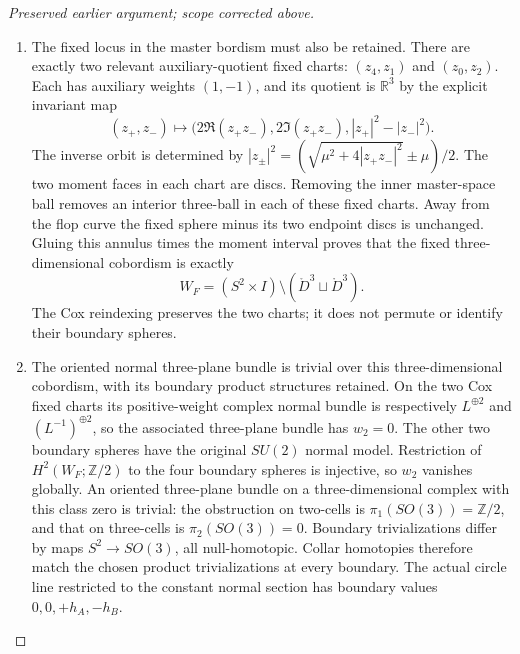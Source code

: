 \begin{proof}[Preserved earlier argument; scope corrected above]
\begin{enumerate}[label=\arabic*.]
\par\medskip\noindent\textbf{The additional normal-sphere boundary in the surgery bordism.}\enspace

\item The fixed locus in the master bordism must also be retained.
There are exactly two relevant auxiliary-quotient fixed charts:
\((z_4,z_1)\) and \((z_0,z_2)\).  Each has auxiliary
weights \((1,-1)\), and its quotient is \(\mathbb R^3\)
by the explicit invariant map
\[
      (z_+,z_-)\longmapsto
       \bigl(2\Re(z_+z_-),2\Im(z_+z_-),
                         |z_+|^2-|z_-|^2\bigr).
\]
The inverse orbit is determined by
\(|z_\pm|^2=(\sqrt{\mu^2+4|z_+z_-|^2}\pm\mu)/2\).
The two moment faces in each chart are discs.  Removing the
inner master-space ball removes an interior three-ball in
each of these fixed charts.  Away from the flop curve the
fixed sphere minus its two endpoint discs is unchanged.
Gluing this annulus times the moment interval proves that
the fixed three-dimensional cobordism is exactly
\[
                 W_F=(S^2\times I)\setminus
                             (\mathring D^3\sqcup\mathring D^3).
\]
The Cox reindexing preserves the two charts; it does not
permute or identify their boundary spheres.

\item The oriented normal three-plane bundle is trivial over this
three-dimensional cobordism, with its boundary product
structures retained.  On the two Cox fixed charts its
positive-weight complex normal bundle is respectively
\(L^{\oplus2}\) and \((L^{-1})^{\oplus2}\), so the
associated three-plane bundle has \(w_2=0\).  The other
two boundary spheres have the original \(SU(2)\) normal
model.  Restriction of \(H^2(W_F;\mathbb Z/2)\) to
the four boundary spheres is injective, so \(w_2\) vanishes
globally.  An oriented three-plane bundle on a three-dimensional
complex with this class zero is trivial: the obstruction on
two-cells is \(\pi_1(SO(3))=\mathbb Z/2\), and that
on three-cells is \(\pi_2(SO(3))=0\).  Boundary
trivializations differ by maps \(S^2\to SO(3)\), all
null-homotopic.  Collar homotopies therefore match the chosen
product trivializations at every boundary.  The actual circle
line restricted to the constant normal section has boundary
values \(0,0,+h_A,-h_B\).


\end{enumerate}
\end{proof}
